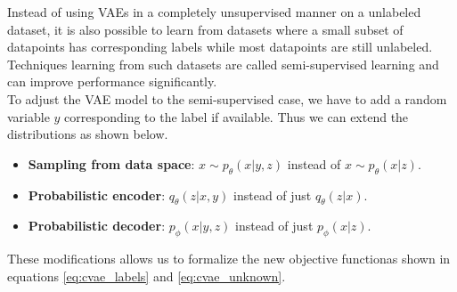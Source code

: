 Instead of using VAEs in a completely unsupervised manner on a unlabeled dataset, it is also possible to learn from datasets where a small subset of datapoints has corresponding labels while most datapoints are still unlabeled.
Techniques learning from such datasets are called semi-supervised learning and can improve performance significantly.\\

To adjust the VAE model to the semi-supervised case, we have to add a random variable $y$ corresponding to the label if available.
Thus we can extend the distributions as shown below.




\begin{itemize}
\item \textbf{Sampling from data space}: $x \sim p_\theta(x|y,z)$ instead of $x \sim p_\theta(x|z)$.\\
\item \textbf{Probabilistic encoder}: $q_\theta(z|x,y)$ instead of just $q_\theta(z|x)$.\\
\item \textbf{Probabilistic decoder}: $p_\phi(x|y,z)$ instead of just $p_\phi(x|z)$.\\
\end{itemize}

These modifications allows us to formalize the new objective functionas shown in equations \ref{eq:cvae_labels} and \ref{eq:cvae_unknown}.

